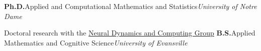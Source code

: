 \begin{rubric}{}
%
\entry*[2015 -- 2020]
    \textbf{Ph.D.}\cvbar Applied and Computational Mathematics and Statistics\cvbar \emph{University of Notre Dame}
    \par Doctoral research with the \href{https://robertrosenbaum.github.io/robertrosenbaum/ndcnd.html}{Neural Dynamics and Computing Group}
%
\entry*[2011 -- 2015]
    \textbf{B.S.}\cvbar Applied Mathematics and Cognitive Science\cvbar \emph{University of Evansville}
%
\end{rubric}
